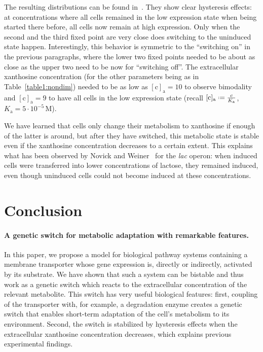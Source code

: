 \documentclass[10pt,letterpaper]{article}
\newcommand{\unit}[1]{\,\mathrm{#1}}
\newcommand{\n}[1]{\mathrm{#1}}
\newcommand*{\defeq}{\mathrel{\vcenter{\baselineskip0.5ex \lineskiplimit0pt
			\hbox{\scriptsize.}\hbox{\scriptsize.}}}%
	=}
\begin{document}
The resulting distributions can be found in~. They show
clear hysteresis effects: at concentrations where all cells remained in the
low expression state when being started there before, all cells now remain
at high expression. Only when the second and the third fixed point are very
close does switching to the uninduced state happen. Interestingly, this
behavior is symmetric to the ``switching on'' in the previous paragraphs,
where the lower two fixed points needed to be about as close as the upper
two need to be now for ``switching off''. The extracellular xanthosine
concentration (for the other parameters being as in
Table~\ref{table1:nondim}) needed to be as low as $\n{[c]_a} = 10$ to
observe bimodality and $\n{[c]_a}=9$ to have all cells in the low expression
state (recall $\n{[c]_{a}} \defeq \frac{c}{K_{\n{a}}}$, $K_{\n{a}} = 5 \cdot
10^{-5} \unit{M}$). 

We have learned that cells only change their metabolism to xanthosine if
enough of the latter is around, but after they have switched, this metabolic
state is stable even if the xanthosine concentration decreases to a certain
extent. This explains what has been observed by Novick and
Weiner~\cite{Novick1957} for the \emph{lac} operon: when induced cells were
transferred into lower concentrations of lactose, they remained induced,
even though uninduced cells could not become induced at these
concentrations.


\section*{Conclusion}
\paragraph*{A genetic switch for metabolic adaptation with remarkable features.}
In this paper, we propose a model for biological pathway systems containing
a membrane transporter whose gene expression is, directly or indirectly,
activated by its substrate. We have shown that such a system can be bistable
and thus work as a genetic switch which reacts to the extracellular
concentration of the relevant metabolite. This switch has very useful
biological features: first, coupling of the transporter with, for example, a
degradation enzyme creates a genetic switch that enables short-term
adaptation of the cell's metabolism to its environment. Second, the switch
is stabilized by hysteresis effects when the extracellular xanthosine
concentration decreases, which explains previous experimental findings.
\end{document}
